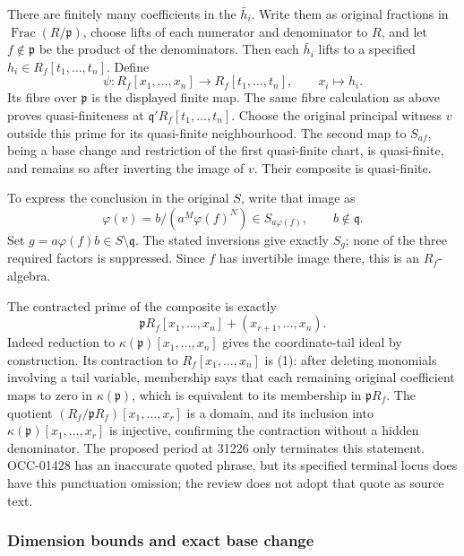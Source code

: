 There are finitely many coefficients in the \(\bar h_i\). Write them as original fractions in \(\operatorname{Frac}(R/\mathfrak p)\), choose lifts of each numerator and denominator to \(R\), and let \(f\notin\mathfrak p\) be the product of the denominators. Then each \(\bar h_i\) lifts to a specified \(h_i\in R_f[t_1,\ldots,t_n]\). Define \[
 \psi:R_f[x_1,\ldots,x_n]\longrightarrow R_f[t_1,\ldots,t_n],
 \qquad x_i\longmapsto h_i.
\] Its fibre over \(\mathfrak p\) is the displayed finite map. The same fibre calculation as above proves quasi-finiteness at \(\mathfrak q'R_f[t_1,\ldots,t_n]\). Choose the original principal witness \(v\) outside this prime for its quasi-finite neighbourhood. The second map to \(S_{af}\), being a base change and restriction of the first quasi-finite chart, is quasi-finite, and remains so after inverting the image of \(v\). Their composite is quasi-finite.

To express the conclusion in the original \(S\), write that image as \[
 \varphi(v)=b/(a^M\varphi(f)^N)\in S_{a\varphi(f)},
 \qquad b\notin\mathfrak q.
\] Set \(g=a\varphi(f)b\in S\setminus\mathfrak q\). The stated inversions give exactly \(S_g\); none of the three required factors is suppressed. Since \(f\) has invertible image there, this is an \(R_f\)-algebra.

The contracted prime of the composite is exactly \[
 \mathfrak pR_f[x_1,\ldots,x_n]+
                      (x_{r+1},\ldots,x_n).
 \tag{1}
\] Indeed reduction to \(\kappa(\mathfrak p)[x_1,\ldots,x_n]\) gives the coordinate-tail ideal by construction. Its contraction to \(R_f[x_1,\ldots,x_n]\) is (1): after deleting monomials involving a tail variable, membership says that each remaining original coefficient maps to zero in \(\kappa(\mathfrak p)\), which is equivalent to its membership in \(\mathfrak pR_f\). The quotient \((R_f/\mathfrak pR_f)[x_1,\ldots,x_r]\) is a domain, and its inclusion into \(\kappa(\mathfrak p)[x_1,\ldots,x_r]\) is injective, confirming the contraction without a hidden denominator. The proposed period at 31226 only terminates this statement. OCC-01428 has an inaccurate quoted phrase, but its specified terminal locus does have this punctuation omission; the review does not adopt that quote as source text.

\subsubsection{Dimension bounds and exact base change}\label{algebra-proof-034-dimension-bounds-and-exact-base-change}

